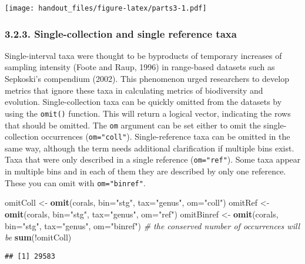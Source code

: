 \documentclass[]{article}
\newenvironment{Shaded}{\begin{snugshade}}{\end{snugshade}}
\newcommand{\KeywordTok}[1]{\textcolor[rgb]{0.13,0.29,0.53}{\textbf{{#1}}}}
\newcommand{\DataTypeTok}[1]{\textcolor[rgb]{0.13,0.29,0.53}{{#1}}}
\newcommand{\StringTok}[1]{\textcolor[rgb]{0.31,0.60,0.02}{{#1}}}
\newcommand{\CommentTok}[1]{\textcolor[rgb]{0.56,0.35,0.01}{\textit{{#1}}}}
\newcommand{\NormalTok}[1]{{#1}}
\begin{document}
\texttt{[image: handout\_files/figure-latex/parts3-1.pdf]}

\subsubsection{3.2.3. Single-collection and single reference
taxa}\label{single-collection-and-single-reference-taxa}

Single-interval taxa were thought to be byproducts of temporary
increases of sampling intensity (Foote and Raup, 1996) in range-based
datasets such as Sepkoski's compendium (2002). This phenomenon urged
researchers to develop metrics that ignore these taxa in calculating
metrics of biodiversity and evolution. Single-collection taxa can be
quickly omitted from the datasets by using the \texttt{omit()} function.
This will return a logical vector, indicating the rows that should be
omitted. The \texttt{om} argument can be set either to omit the
single-collection occurrences (\texttt{om="coll"}). Single-reference
taxa can be omitted in the same way, although the term needs additional
clarification if multiple bins exist. Taxa that were only described in a
single reference (\texttt{om="ref"}). Some taxa appear in multiple bins
and in each of them they are described by only one reference. These you
can omit with \texttt{om="binref"}.

\begin{Shaded}
\begin{Highlighting}[]
\NormalTok{omitColl <-}\StringTok{ }\KeywordTok{omit}\NormalTok{(corals, }\DataTypeTok{bin=}\StringTok{"stg"}\NormalTok{, }\DataTypeTok{tax=}\StringTok{"genus"}\NormalTok{, }\DataTypeTok{om=}\StringTok{"coll"}\NormalTok{)}
\NormalTok{omitRef <-}\StringTok{ }\KeywordTok{omit}\NormalTok{(corals, }\DataTypeTok{bin=}\StringTok{"stg"}\NormalTok{, }\DataTypeTok{tax=}\StringTok{"genus"}\NormalTok{, }\DataTypeTok{om=}\StringTok{"ref"}\NormalTok{)}
\NormalTok{omitBinref <-}\StringTok{ }\KeywordTok{omit}\NormalTok{(corals, }\DataTypeTok{bin=}\StringTok{"stg"}\NormalTok{, }\DataTypeTok{tax=}\StringTok{"genus"}\NormalTok{, }\DataTypeTok{om=}\StringTok{"binref"}\NormalTok{)}
\CommentTok{# the conserved number of occurrences will be}
\KeywordTok{sum}\NormalTok{(!omitColl)}
\end{Highlighting}
\end{Shaded}

\begin{verbatim}
## [1] 29583
\end{verbatim}
\end{document}
